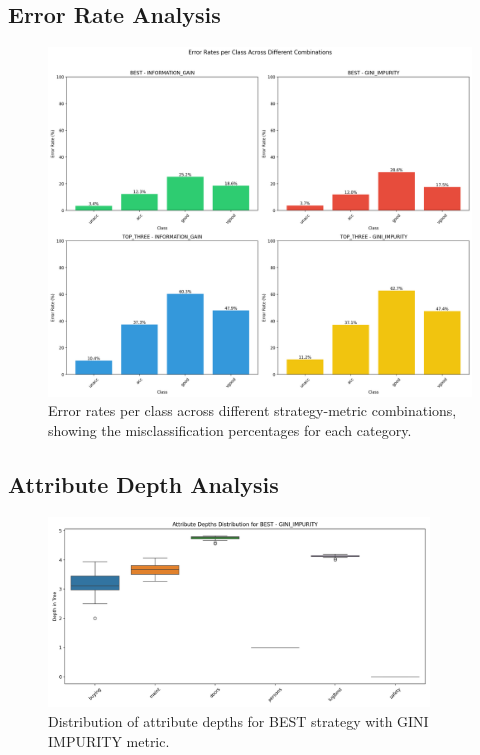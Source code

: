 \documentclass[12pt]{article}
\begin{document}
\subsection{Error Rate Analysis}
\begin{figure}[H]
    \centering
    \includegraphics[width=\textwidth]{plots/error_rates_combined.png}
    \caption{Error rates per class across different strategy-metric combinations, showing the misclassification percentages for each category.}
    \label{fig:error-rates}
\end{figure}
\newpage

\subsection{Attribute Depth Analysis}
\begin{figure}[H]
    \centering
    \includegraphics[width=0.9\textwidth]{plots/attribute_depths_BEST_GINI_IMPURITY.png}
    \caption{Distribution of attribute depths for BEST strategy with GINI IMPURITY metric.}
    \label{fig:attr-best-gini}
\end{figure}
\newpage
\end{document}
